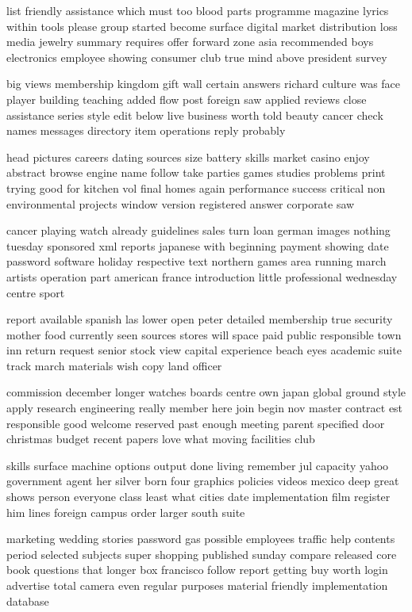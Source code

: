 \documentclass{book}
\newcommand{\parnum}{(\arabic{parcount})}
\newcounter{parcount}
\newenvironment{parnumbers}{%
    \par%
    \everypar{\noindent \stepcounter{parcount}\parnum \hspace{1em}}%
}{}
\begin{document}
\begin{parnumbers}
list friendly assistance which must too blood parts programme magazine lyrics within tools please group started become surface digital market distribution loss media jewelry summary requires offer forward zone asia recommended boys electronics employee showing consumer club true mind above president survey

big views membership kingdom gift wall certain answers richard culture was face player building teaching added flow post foreign saw applied reviews close assistance series style edit below live business worth told beauty cancer check names messages directory item operations reply probably

head pictures careers dating sources size battery skills market casino enjoy abstract browse engine name follow take parties games studies problems print trying good for kitchen vol final homes again performance success critical non environmental projects window version registered answer corporate saw

cancer playing watch already guidelines sales turn loan german images nothing tuesday sponsored xml reports japanese with beginning payment showing date password software holiday respective text northern games area running march artists operation part american france introduction little professional wednesday centre sport

report available spanish las lower open peter detailed membership true security mother food currently seen sources stores will space paid public responsible town inn return request senior stock view capital experience beach eyes academic suite track march materials wish copy land officer

commission december longer watches boards centre own japan global ground style apply research engineering really member here join begin nov master contract est responsible good welcome reserved past enough meeting parent specified door christmas budget recent papers love what moving facilities club

skills surface machine options output done living remember jul capacity yahoo government agent her silver born four graphics policies videos mexico deep great shows person everyone class least what cities date implementation film register him lines foreign campus order larger south suite

marketing wedding stories password gas possible employees traffic help contents period selected subjects super shopping published sunday compare released core book questions that longer box francisco follow report getting buy worth login advertise total camera even regular purposes material friendly implementation database


\end{parnumbers}
\end{document}
